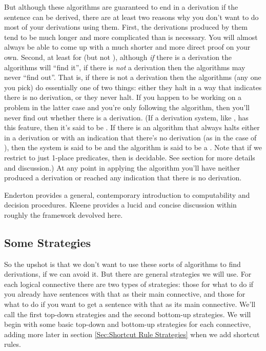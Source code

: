 But although these algorithms are guaranteed to end in a derivation if the sentence can be derived, there are at least two reasons why you don't want to do most of your derivations using them. 
First, the derivations produced by them tend to be much longer and more complicated than is necessary. 
You will almost always be able to come up with a much shorter and more direct proof on your own. 
Second, at least for \GQD{} (but not \GSD{}), although \emph{if} there is a derivation the algorithms will ``find it'', if there is \emph{not} a derivation then the algorithms may never ``find out''. 
That is, if there is not a derivation then the algorithms (any one you pick) do essentially one of two things: either they halt in a way that indicates there is no derivation, or they never halt. 
If you happen to be working on a problem in the latter case and you're only following the algorithm, then you'll never find out whether there is a derivation. 
(If a derivation system, like \GQD{}, has this feature, then it's said to be . 
If there is an algorithm that always halts either in a derivation or with an indication that there's no derivation (as in the case of \GSD{}), then the system is said to be  and the algorithm is said to be a .
Note that if we restrict \GQL{} to just 1-place predicates, then \GQD{} is decidable.
See section  for more details and discussion.)
At any point in applying the algorithm you'll have neither produced a derivation or reached any indication that there is no derivation.

Enderton \citeyearpar{Enderton2010} provides a general, contemporary introduction to computability and decision procedures. Kleene \citeyearpar[ch.~5]{Kleene1967} provides a lucid and concise discussion within roughly the framework devolved here.

\subsection{Some Strategies}\label{Sec:Some Strategies}
So the upshot is that we don't want to use these sorts of algorithms to find derivations, if we can avoid it. 
But there are general strategies we will use. 
For each logical connective there are two types of strategies: those for what to do if you already have sentences with that as their main connective, and those for what to do if you want to get a sentence with that as its main connective. 
We'll call the first top-down strategies and the second bottom-up strategies.
We will begin with some basic top-down and bottom-up strategies for each connective, adding more later in section \ref{Sec:Shortcut Rule Strategies} when we add shortcut rules.

